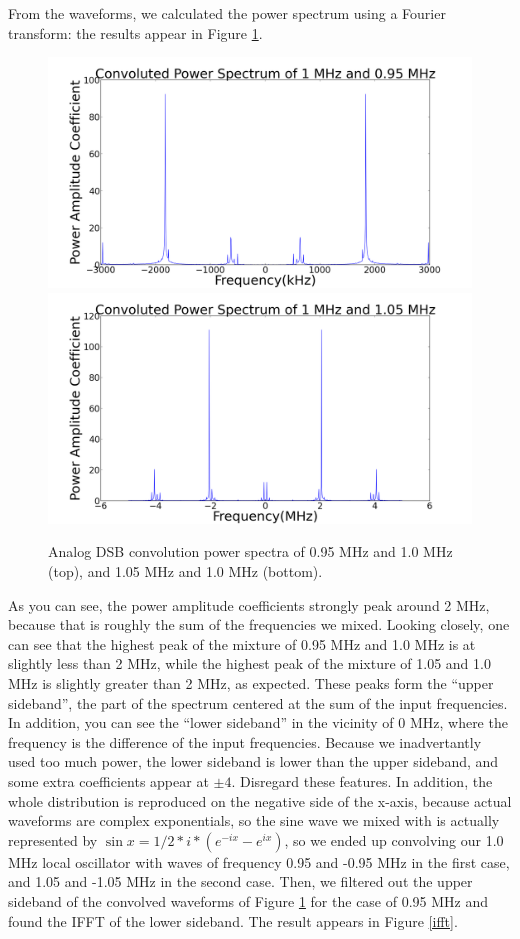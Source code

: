 \documentclass[11pt]{article}
\begin{document}
From the waveforms, we calculated the power spectrum using a Fourier transform: the results appear in Figure \ref{adsb}.

\begin{figure}
\centering
\includegraphics[scale=0.35]{pictures/opointninefive}
\includegraphics[scale=0.35]{pictures/onepointofive}
\caption{Analog DSB convolution power spectra of 0.95 MHz and 1.0 MHz (top), and 1.05 MHz and 1.0 MHz (bottom). \label{adsb}}
\end{figure}

 As you can see, the power amplitude coefficients strongly peak around 2 MHz, because that is roughly the sum of the frequencies we mixed. Looking closely, one can see that the highest peak of the mixture of 0.95 MHz and 1.0 MHz is at slightly less than 2 MHz, while the highest peak of the mixture of 1.05 and 1.0 MHz is slightly greater than 2 MHz, as expected. These peaks form the ``upper sideband'', the part of the spectrum centered at the sum of the input frequencies. In addition, you can see the ``lower sideband'' in the vicinity of 0 MHz, where the frequency is the difference of the input frequencies. Because we inadvertantly used too much power, the lower sideband is lower than the upper sideband, and some extra coefficients appear at $\pm 4$. Disregard these features. In addition, the whole distribution is reproduced on the negative side of the x-axis, because actual waveforms are complex exponentials, so the sine wave we mixed with is actually represented by $\sin{x} = 1/2 * i * (e^{-ix} - e^{ix})$, so we ended up convolving our 1.0 MHz local oscillator with waves of frequency 0.95 and -0.95 MHz  in the first case, and 1.05 and -1.05 MHz in the second case. Then, we filtered out the upper sideband of the convolved waveforms of Figure \ref{adsb} for the case of 0.95 MHz and found the IFFT of the lower sideband. The result appears in Figure \ref{ifft}. 
\end{document}

